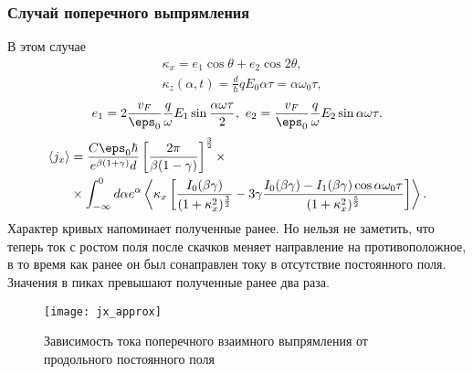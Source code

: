 \subsubsection{Случай поперечного выпрямления}
В этом случае
\begin{align*}
    & \kappa_x = e_1\cos\theta + e_2\cos2\theta,\\
    &\kappa_z(\alpha, t) = \frac{d}{\hbar}qE_0\alpha\tau = \alpha\omega_0\tau,
\end{align*}
\begin{equation*}
    e_1 = 2\frac{v_F}{\eps_0}\frac{q}{\omega}E_1 \sin\frac{\alpha\omega\tau}{2},
    \ e_2 = \frac{v_F}{\eps_0}\frac{q}{\omega}E_2 \sin\alpha\omega\tau.
\end{equation*}
\begin{align*}
    \langle j_x \rangle &=
    \frac{C\eps_0\hbar}{e^{\beta(1+\gamma)}d}\left[\frac{2\pi}{\beta(1-\gamma)}\right]^\frac{3}{2}\times\\&\times
  \int_{-\infty}^{0} d \alpha e^{\alpha} \left\langle
    \kappa_x\left[\frac{I_0(\beta\gamma)}{(1+\kappa_x^2)^\frac{3}{2}}-3\gamma
    \frac{I_0(\beta\gamma)-I_1(\beta\gamma)\cos\alpha\omega_0\tau}{(1 +
    \kappa_x^2)^\frac{5}{2}}\right]\right\rangle.
\end{align*}
Характер кривых напоминает полученные ранее. Но нельзя не заметить, что теперь ток с ростом поля после скачков меняет направление на противоположное, в то время как ранее он был сонаправлен току в отсутствие постоянного поля. Значения в пиках превышают полученные ранее два раза.
\begin{figure}[ht]
    \center
    \texttt{[image: jx\_approx]}
    \caption{Зависимость тока поперечного взаимного выпрямления от продольного постоянного поля}
\end{figure}

